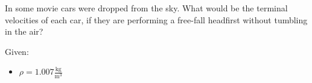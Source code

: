
In some movie cars were dropped from the sky.
What would be the terminal velocities of each car, if they are
performing a free-fall headfirst without tumbling in the air?

\bigbreak Given:
\begin{itemize}
    \item $\rho = 1.007 \frac{\text{kg}}{\text{m}^3}$
\end{itemize}
